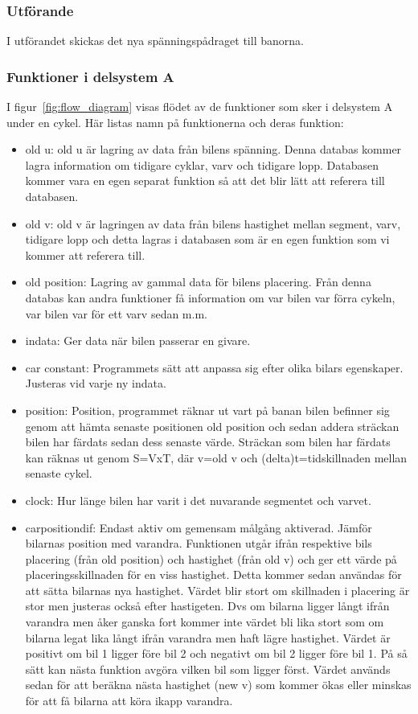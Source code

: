     \subsubsection{Utförande}

    I utförandet skickas det nya spänningspådraget till banorna. 
	

    \subsubsection{Funktioner i delsystem A} \label{sec:system_a_funcs}
    I figur~\ref{fig:flow_diagram}  visas flödet av de funktioner som sker i delsystem A under en cykel.
    Här listas namn på funktionerna och deras funktion:
    \begin{itemize}
	\item old u: old u är lagring av data från bilens spänning. Denna databas kommer lagra information om tidigare cyklar, varv och tidigare lopp. Databasen kommer vara en egen separat funktion så att det blir lätt att referera till databasen.
	\item old v: old v är lagringen av data från bilens hastighet mellan segment, varv, tidigare lopp och detta lagras i databasen som är en egen funktion som vi kommer att referera till. 
	\item old position: Lagring av gammal data för bilens placering. Från denna databas kan andra funktioner få information om var bilen var förra cykeln, var bilen var för ett varv sedan m.m.
      \item indata: Ger data när bilen passerar en givare.
      \item car constant: Programmets sätt att anpassa sig efter olika bilars egenskaper. Justeras vid varje ny indata.
      \item position: Position, programmet räknar ut vart på banan bilen befinner sig genom att hämta senaste positionen old position och sedan addera sträckan bilen har färdats sedan dess senaste värde. Sträckan som bilen har färdats kan räknas ut genom S=VxT, där v=old v och (delta)t=tidskillnaden mellan senaste cykel.
      \item clock: Hur länge bilen har varit i det nuvarande segmentet och varvet.

      \item car\textunderscore position\textunderscore dif: Endast aktiv om gemensam målgång aktiverad. Jämför bilarnas position med varandra. Funktionen utgår ifrån respektive bils placering (från old position) och hastighet (från old v) 
och ger ett värde på placeringsskillnaden för en viss hastighet. Detta kommer
sedan användas för att sätta bilarnas nya hastighet. Värdet blir stort om skillnaden i placering är stor men justeras också efter hastigeten. Dvs om bilarna ligger långt ifrån varandra men åker ganska fort kommer inte värdet bli lika stort som om bilarna legat lika långt ifrån varandra men haft lägre hastighet. Värdet är positivt om bil 1 ligger före bil 2 och negativt om bil 2 ligger före bil 1. På så sätt kan nästa funktion avgöra vilken bil som ligger först.
Värdet används sedan för att beräkna nästa hastighet (new v) som kommer ökas eller minskas för att få bilarna att köra ikapp varandra. 


\end{itemize}
